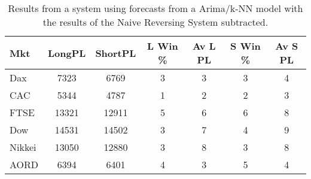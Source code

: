 \begin{table}[ht]
\centering
\caption[Mean PL from hybrid ARIMA/k-NN models minus mean PL from Naive Reverse system]{Results from a system using forecasts from a Arima/k-NN model with the results of the Naive Reversing System subtracted.} 
\label{tab:chp_ts:pred_close_arima_knn_sys1_diff}
\begin{tabular}{lcccccc}
  \toprule Mkt & LongPL & ShortPL & L Win \% & Av L PL & S Win \% & Av S PL \\ 
  \midrule Dax & 7323 & 6769 & 3 & 3 & 3 & 4 \\ 
  CAC & 5344 & 4787 & 1 & 2 & 2 & 3 \\ 
  FTSE & 13321 & 12911 & 5 & 6 & 6 & 8 \\ 
  Dow & 14531 & 14502 & 3 & 7 & 4 & 9 \\ 
  Nikkei & 13050 & 12880 & 3 & 8 & 3 & 8 \\ 
  AORD & 6394 & 6401 & 4 & 3 & 5 & 4 \\ 
   \bottomrule \end{tabular}
\end{table}
